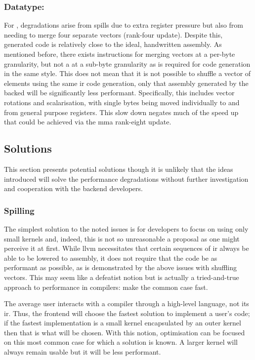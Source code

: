 \documentclass[\main/thesis.tex]{subfiles}
\begin{document}
\subsubsection{Datatype: \texorpdfstring{}{i4}}
For , degradations arise from \glspl{spill} due to extra register pressure but also from needing to merge four separate vectors (rank-four update).
Despite this, generated code is relatively close to the ideal, handwritten assembly.
As mentioned before, there exists instructions for merging vectors at a per-byte granularity, but not a at a sub-byte granularity as is required for  code generation in the same style.
This does not mean that it is not possible to shuffle a vector of  elements using the same \gls{ir} code generation, only that assembly generated by the backed will be significantly less performant.
Specifically, this includes vector rotations and scalarisation, with single bytes being moved individually to and from general purpose registers.
This slow down negates much of the speed up that could be achieved via the \gls{mma} rank-eight update.

\subsection{Solutions}
This section presents potential solutions though it is unlikely that the ideas introduced will solve the performance degradations without further investigation and cooperation with the backend developers.

\subsubsection{Spilling}
The simplest solution to the noted  issues is for developers to focus on using only small kernels and, indeed, this is not so unreasonable a proposal as one might perceive it at first.
While \gls{llvm} necessitates that certain sequences of \gls{ir} always be able to be lowered to assembly, it does not require that the code be as performant as possible, as is demonstrated by the above issues with shuffling  vectors.
This may seem like a defeatist notion but is actually a tried-and-true approach to performance in compilers: make the common case fast.

The average user interacts with a compiler through a high-level language, not its \gls{ir}.
Thus, the frontend will choose the fastest solution to implement a user's code; if the fastest implementation is a small kernel encapsulated by an outer kernel then that is what will be chosen.
With this notion, optimisation can be focused on this most common case for which a solution is known.
A larger kernel will always remain usable but it will be less performant.
\end{document}
